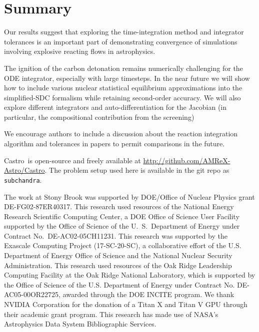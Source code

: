 \documentclass[modern]{aastex631}
\newcommand{\castro}{{\sf Castro}}
\newcommand{\MarginPar}[1]{
    \marginpar{\vskip-\baselineskip%
               \raggedright%
               \tiny\sffamily%
               {\color{red}\hrule%
               \smallskip%
               #1\par%
               \smallskip%
               \hrule}}%
}
\begin{document}
\section{Summary}

Our results suggest that exploring the time-integration method and
integrator tolerances is an important part of demonstrating
convergence of simulations involving explosive reacting flows in
astrophysics.

The ignition of the carbon detonation remains numerically challenging
for the ODE integrator, especially with large
timesteps.  \MarginPar{add some info on why it fails} In the near
future we will show how to include various nuclear statistical
equilibrium approximations into the simplified-SDC formalism while
retaining second-order accuracy.  We will also explore different
integrators and auto-differentiation for the Jacobian (in particular,
the compositional contribution from the screening)

We encourage authors to include a discussion about the reaction
integration algorithm and tolerances in papers to permit comparisons
in the future.

\begin{acknowledgements}
\castro\ is open-source and freely available at
\url{http://github.com/AMReX-Astro/Castro}.  The problem setup used
here is available in the git repo as {\tt subchandra}.  

The work at Stony Brook was supported by DOE/Office of Nuclear
Physics grant DE-FG02-87ER40317.  This research used resources of the
National Energy Research Scientific Computing Center, a DOE Office of
Science User Facility supported by the Office of Science of the
U.~S.\ Department of Energy under Contract No.\ DE-AC02-05CH11231.
This research was supported by the Exascale Computing Project
(17-SC-20-SC), a collaborative effort of the U.S. Department of Energy
Office of Science and the National Nuclear Security Administration.
This research used resources of the Oak Ridge Leadership Computing
Facility at the Oak Ridge National Laboratory, which is supported by
the Office of Science of the U.S. Department of Energy under Contract
No. DE-AC05-00OR22725, awarded through the DOE INCITE program.  We
thank NVIDIA Corporation for the donation of a Titan X and Titan V GPU
through their academic grant program.  This research has made use of
NASA's Astrophysics Data System Bibliographic Services.
\end{acknowledgements}

\end{document}
